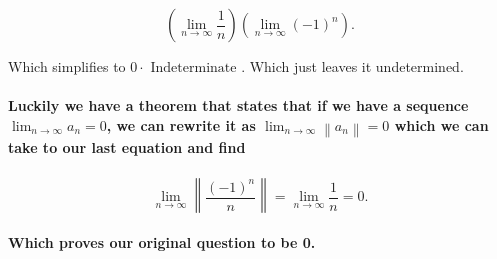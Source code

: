 \[
	\left( \lim_{n \to \infty} \frac{1}{n} \right) \left( \lim_{n \to \infty} \left( -1 \right) ^{n} \right) 
.\] 

Which simplifies to $0 \cdot \text{ Indeterminate }$. Which just leaves it undetermined. 

\paragraph{Luckily we have a theorem that states that if we have a sequence $\lim_{n \to \infty} a_n = 0$, we can rewrite it as $\lim_{n \to \infty} \left\|a_n\right\| = 0$ which we can take to our last equation and find}

\[
\lim_{n \to \infty} \left\|\frac{\left( -1 \right) ^{n}}{n}\right\|=\lim_{n \to \infty} \frac{1}{n}=0
.\] 
\paragraph{Which proves our original question to be 0.}

